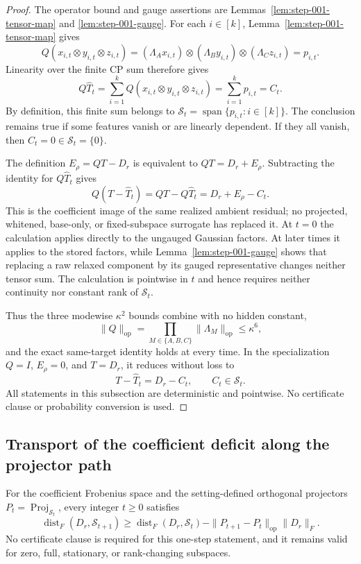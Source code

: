 \begin{proof}
The operator bound and gauge assertions are
Lemmas~\ref{lem:step-001-tensor-map} and \ref{lem:step-001-gauge}.  For each
$i\in[k]$, Lemma~\ref{lem:step-001-tensor-map} gives
\[
Q(x_{i,t}\otimes y_{i,t}\otimes z_{i,t})
=(\Lambda_Ax_{i,t})\otimes(\Lambda_By_{i,t})
 \otimes(\Lambda_Cz_{i,t})
=p_{i,t}.
\]
Linearity over the finite CP sum therefore gives
\[
Q\widehat T_t
=\sum_{i=1}^kQ(x_{i,t}\otimes y_{i,t}\otimes z_{i,t})
=\sum_{i=1}^kp_{i,t}
=C_t.
\]
By definition, this finite sum belongs to
$\mathcal S_t=\operatorname{span}\{p_{i,t}:i\in[k]\}$.  The conclusion
remains true if some features vanish or are linearly dependent.  If they all
vanish, then $C_t=0\in\mathcal S_t=\{0\}$.

The definition $E_\rho=QT-D_r$ is equivalent to $QT=D_r+E_\rho$.
Subtracting the identity for $Q\widehat T_t$ gives
\[
Q(T-\widehat T_t)=QT-Q\widehat T_t=D_r+E_\rho-C_t.
\]
This is the coefficient image of the same realized ambient residual; no
projected, whitened, base-only, or fixed-subspace surrogate has replaced it.
At $t=0$ the calculation applies directly to the ungauged Gaussian factors.
At later times it applies to the stored factors, while
Lemma~\ref{lem:step-001-gauge} shows that replacing a raw relaxed component
by its gauged representative changes neither tensor sum.  The calculation is
pointwise in $t$ and hence requires neither continuity nor constant rank of
$\mathcal S_t$.

Thus the three modewise $\kappa^2$ bounds combine with no hidden constant,
\[
\|Q\|_{\mathrm{op}}
=\prod_{M\in\{A,B,C\}}\|\Lambda_M\|_{\mathrm{op}}
\leq\kappa^6,
\]
and the exact same-target identity holds at every time.  In the specialization
$Q=I$, $E_\rho=0$, and $T=D_r$, it reduces without loss to
\[
T-\widehat T_t=D_r-C_t,
\qquad C_t\in\mathcal S_t.
\]
All statements in this subsection are deterministic and pointwise.  No
certificate clause or probability conversion is used.
\end{proof}

\subsection{Transport of the coefficient deficit along the projector path}
\label{app:step-002}

\begin{lemma}
\label{lem:step-002-one-step-transport}
For the coefficient Frobenius space and the setting-defined orthogonal
projectors $P_t=\operatorname{Proj}_{\mathcal S_t}$, every integer $t\geq0$
satisfies
\[
\operatorname{dist}_F(D_r,\mathcal S_{t+1})
\geq
\operatorname{dist}_F(D_r,\mathcal S_t)
-\|P_{t+1}-P_t\|_{\mathrm{op}}\|D_r\|_F.
\]
No certificate clause is required for this one-step statement, and it remains
valid for zero, full, stationary, or rank-changing subspaces.
\end{lemma}

